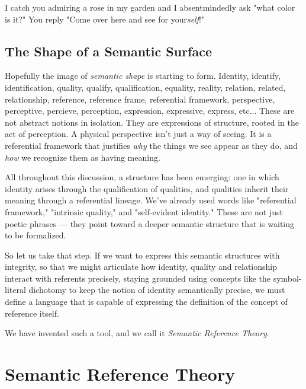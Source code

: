 \documentclass[runningheads]{llncs}
\begin{document}
\setcounter{definition}{0}
\begin{cexample}
I catch you admiring a rose in my garden and I absentmindedly ask "what color is it?" You reply "Come over here and see for your\emph{self}!"  
\end{cexample}

\subsection{The Shape of a Semantic Surface}

Hopefully the image of \emph{semantic shape} is starting to form. Identity, identify, identification, quality, qualify, qualification, equality, reality, relation, related, relationship, reference, reference frame, referential framework, perspective, perceptive, percieve, perception, expression, expressive, express, etc... These are not abstract notions in isolation. They are expressions of structure, rooted in the act of perception. A physical perspective isn't just a way of seeing. It is a referential framework that justifies \emph{why} the things we see appear as they do, and \emph{how} we recognize them as having meaning.

All throughout this discussion, a structure has been emerging: one in which identity arises through the qualification of qualities, and qualities inherit their meaning through a referential lineage. We've already used words like "referential framework," "intrinsic quality," and "self-evident identity." These are not just poetic phrases — they point toward a deeper semantic structure that is waiting to be formalized.

So let us take that step. If we want to express this semantic structures with integrity, so that we might articulate how identity, quality and relationship interact with referents precisely, staying grounded using concepts like the symbol-literal dichotomy to keep the notion of identity semantically precise, we must define a language that is capable of expressing the definition of the concept of reference itself.

We have invented such a tool, and we call it \emph{Semantic Reference Theory}.


\section{Semantic Reference Theory}
\end{document}
